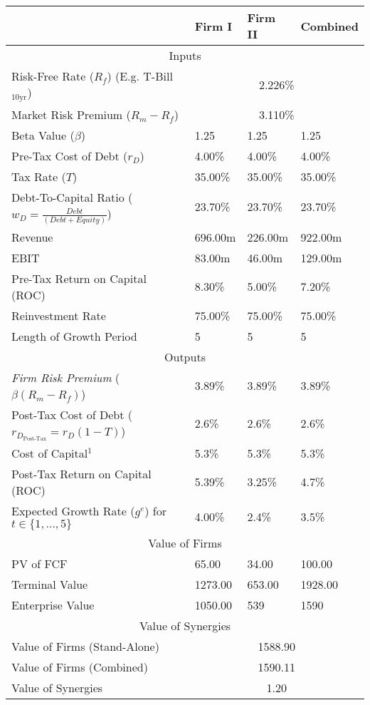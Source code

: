 \documentclass[11pt, english]{article}
\begin{document}
	\newpage

	\begin{center}
		\scriptsize
	\begin{longtable}{p{6.5cm}|p{1.5cm}p{1.5cm}p{1.5cm}}
		& Firm I & Firm II & Combined\\
		\hline
		\hline
		\multicolumn{4}{c}{Inputs}\\
		\hline
		\hline
		Risk-Free Rate ($R_f$) (E.g. T-Bill$_{\textrm{10yr}}$) & \multicolumn{3}{c}{2.226\%}\\
		Market Risk Premium ($R_m-R_f$) & \multicolumn{3}{c}{3.110\%}\\
		Beta Value ($\beta$) & 1.25 & 1.25 & 1.25\\
		\hline
		Pre-Tax Cost of Debt ($r_D$) & 4.00\% & 4.00\% & 4.00\%\\
		Tax Rate ($T$) & 35.00\% & 35.00\% & 35.00\%\\
		Debt-To-Capital Ratio ($w_D=\frac{Debt}{(Debt+Equity)}$) & 23.70\% & 23.70\% & 23.70\%\\
		\hline
		Revenue & 696.00m & 226.00m & 922.00m\\
		EBIT & 83.00m & 46.00m & 129.00m\\
		\hline
		Pre-Tax Return on Capital (ROC) & 8.30\% & 5.00\% & 7.20\%\\
		Reinvestment Rate & 75.00\% & 75.00\% & 75.00\%\\
		Length of Growth Period & 5 & 5 & 5\\
		\hline
		\hline
		\multicolumn{4}{c}{Outputs}\\
		\hline
		\hline
		\textit{Firm Risk Premium} ($\beta(R_m-R_f)$) & 3.89\% & 3.89\% & 3.89\%\\
		\hline
		Post-Tax Cost of Debt ($r_{D_{\textrm{Post-Tax}}}=r_D(1-T)$) & 2.6\% & 2.6\% & 2.6\%\\
		Cost of Capital$^1$ & 5.3\% & 5.3\% & 5.3\%\\
		\hline
		Post-Tax Return on Capital (ROC) & 5.39\% & 3.25\% & 4.7\%\\
		Expected Growth Rate ($g^e$) for $t\in\{1,...,5\}$ & 4.00\% & 2.4\% & 3.5\%\\
		\hline
		\hline
		\multicolumn{4}{c}{Value of Firms}\\
		\hline
		\hline
		PV of FCF & 65.00 & 34.00 & 100.00\\
		Terminal Value & 1273.00 & 653.00 & 1928.00\\
		Enterprise Value & 1050.00 & 539 & 1590\\
		\hline
		\hline
		\multicolumn{4}{c}{Value of Synergies}\\
		\hline
		\hline
		Value of Firms (Stand-Alone) & \multicolumn{3}{c}{1588.90}\\
		Value of Firms (Combined) & \multicolumn{3}{c}{1590.11}\\
		Value of Synergies & \multicolumn{3}{c}{1.20}\\
		\hline
	\end{longtable}
	\end{center}
\end{document}
